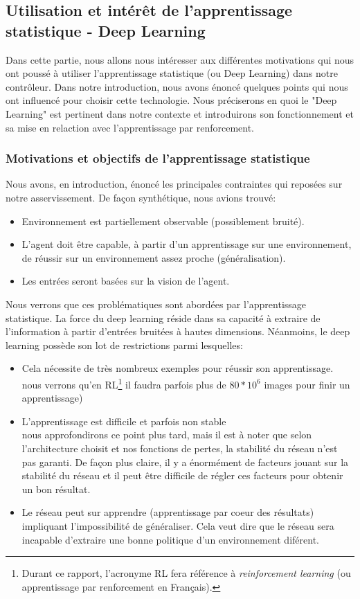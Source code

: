 \subsection{Utilisation et intérêt de l'apprentissage statistique - Deep Learning }

Dans cette partie, nous allons nous intéresser aux différentes motivations qui nous ont poussé à utiliser l'apprentissage statistique (ou Deep Learning) dans notre contrôleur. Dans notre introduction, nous avons énoncé quelques points qui nous ont influencé pour choisir cette technologie. Nous préciserons en quoi le "Deep Learning" est pertinent dans notre contexte et introduirons son fonctionnement et sa mise en relaction avec l'apprentissage par renforcement.

\subsubsection{Motivations et objectifs de l'apprentissage statistique}

Nous avons, en introduction, énoncé les principales contraintes qui reposées sur notre asservissement. De façon synthétique, nous avions trouvé:
\begin{itemize}
    \item Environnement est partiellement observable (possiblement bruité).
    \item L'agent doit être capable, à partir d'un apprentissage sur une environnement,  de réussir sur un environnement assez proche (généralisation).
    \item Les entrées seront basées sur la vision de l'agent.
\end{itemize}

Nous verrons que ces problématiques sont abordées par l'apprentissage statistique. La force du deep learning réside dans sa capacité à extraire de l'information à partir d'entrées bruitées à hautes dimensions. Néanmoins, le deep learning possède son lot de restrictions parmi lesquelles: 

\begin{itemize}
    \item Cela nécessite de très nombreux exemples pour réussir son apprentissage.\\nous verrons qu'en \gls{RL}\footnote{Durant ce rapport, l'acronyme \gls{RL} fera référence à \emph{reinforcement learning} (ou apprentissage par renforcement en Français).} il faudra parfois plus de $80*10^6$ images pour finir un apprentissage)
    \item L'apprentissage est difficile et parfois non stable\\nous approfondirons ce point plus tard, mais il est à noter que selon l'architecture choisit et nos fonctions de pertes, la stabilité du réseau n'est pas garanti. De façon plus claire, il y a énormément de facteurs jouant sur la stabilité du réseau et il peut être difficile de régler ces facteurs pour obtenir un bon résultat. 
    \item Le réseau peut sur apprendre (apprentissage par coeur des résultats) impliquant l'impossibilité de généraliser. Cela veut dire que le réseau sera incapable d'extraire une bonne politique d'un environnement diférent.
\end{itemize}

